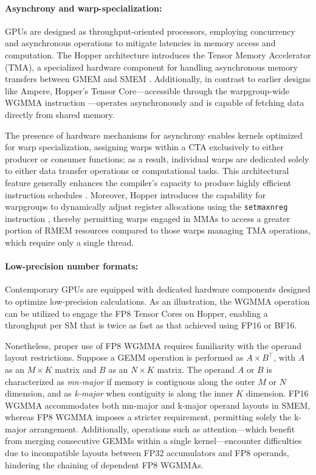 \begin{enumerate}
\paragraph{Asynchrony and warp-specialization:}

GPUs are designed as throughput-oriented processors, employing concurrency and asynchronous operations to mitigate latencies in memory access and computation. The Hopper architecture introduces the Tensor Memory Accelerator (TMA), a specialized hardware component for handling asynchronous memory transfers between GMEM and SMEM \cite[\S7.29]{cuda}. Additionally, in contrast to earlier designs like Ampere, Hopper's Tensor Core—accessible through the warpgroup-wide WGMMA instruction \cite[\S9.7.14]{ptx}—operates asynchronously and is capable of fetching data directly from shared memory.

The presence of hardware mechanisms for asynchrony enables kernels optimized for warp specialization, assigning warps within a CTA exclusively to either producer or consumer functions; as a result, individual warps are dedicated solely to either data transfer operations or computational tasks. This architectural feature generally enhances the compiler's capacity to produce highly efficient instruction schedules \citep{warp-specialization-2011}. Moreover, Hopper introduces the capability for warpgroups to dynamically adjust register allocations using the \verb|setmaxnreg| instruction \cite[\S9.7.17.1]{ptx}, thereby permitting warps engaged in MMAs to access a greater portion of RMEM resources compared to those warps managing TMA operations, which require only a single thread.

\paragraph{Low-precision number formats:}
\label{sec:low-precision-gpu}
Contemporary GPUs are equipped with dedicated hardware components designed to optimize low-precision calculations. As an illustration, the WGMMA operation can be utilized to engage the FP8 Tensor Cores on Hopper, enabling a throughput per SM that is twice as fast as that achieved using FP16 or BF16.

Nonetheless, proper use of FP8 WGMMA requires familiarity with the operand layout restrictions. Suppose a GEMM operation is performed as $A \times B^{\top}$, with $A$ as an $M\times K$ matrix and $B$ as an $N\times K$ matrix. The operand $A$ or $B$ is characterized as \emph{mn-major} if memory is contiguous along the outer $M$ or $N$ dimension, and as \emph{k-major} when contiguity is along the inner $K$ dimension. FP16 WGMMA accommodates both mn-major and k-major operand layouts in SMEM, whereas FP8 WGMMA imposes a stricter requirement, permitting solely the k-major arrangement. Additionally, operations such as attention—which benefit from merging consecutive GEMMs within a single kernel—encounter difficulties due to incompatible layouts between FP32 accumulators and FP8 operands, hindering the chaining of dependent FP8 WGMMAs.


\end{enumerate}
